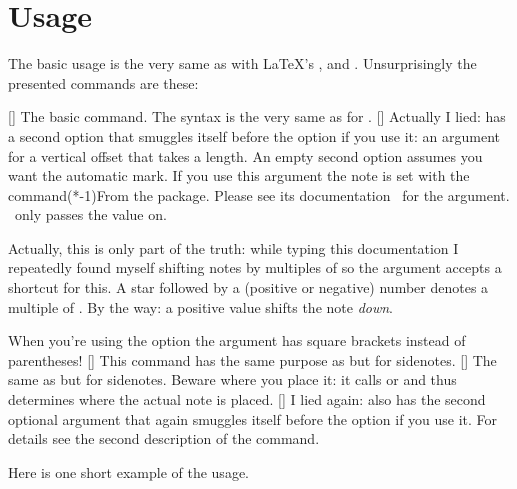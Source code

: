 \documentclass[load-preamble+]{cnltx-doc}
\begin{document}
\section{Usage}\label{sec:usage}
The basic usage is the very same as with \LaTeX's ,
 and .  Unsurprisingly the presented
commands are these:
\begin{commands}
  []
    The basic command.  The syntax is the very same as for .
  []
    Actually I lied:  has a second option that smuggles itself
    before the  option if you use it: an argument for a vertical
    offset that takes a length. An empty second option assumes you want the
    automatic mark.  If you use this argument the note is set with the
     command\sidenote(*-1){From the 
      package}.  Please see its documentation~\cite{pkg:marginnote}
    for the  argument.  \snotez\ only passes the value on.
    
    Actually, this is only part of the truth: while typing this documentation
    I repeatedly found myself shifting notes by multiples of
     so the argument accepts a shortcut for this.  A star
    \code{*} followed by a (positive or negative) number denotes a multiple of
    .  By the way: a positive value shifts the note
    \emph{down}.
    
    When you're using the  option the 
    argument has square brackets instead of parentheses!
  []
    This command has the same purpose as  but for
    sidenotes.
  []
    The same as  but for sidenotes.  Beware where you place
    it: it calls  or  and thus determines where
    the actual note is placed.
  []
    I lied again:  also has the second optional argument
     that again smuggles itself before the  option if
    you use it.  For details see the second description of the 
    command.
\end{commands}

Here is one short example of the usage.
\end{document}
